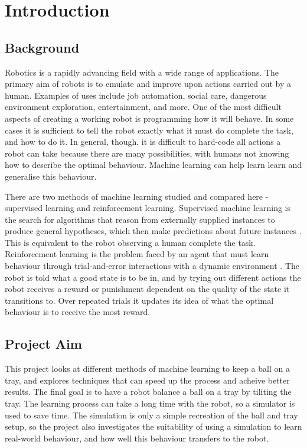 \documentclass[12pt,a4paper]{article}
\begin{document}
\section{Introduction}
\subsection{Background}
Robotics is a rapidly advancing field with a wide range of applications. The primary aim of robots is to emulate and improve upon actions carried out by a human. Examples of uses include job automation, social care, dangerous environment exploration, entertainment, and more. One of the most difficult aspects of creating a working robot is programming how it will behave. In some cases it is sufficient to tell the robot exactly what it must do complete the task, and how to do it. In general, though, it is difficult to hard-code all actions a robot can take because there are many possibilities, with humans not knowing how to describe the optimal behaviour. Machine learning can help learn learn and generalise this behaviour.

There are two methods of machine learning studied and compared here - supervised learning and reinforcement learning. Supervised machine learning is the search for algorithms that reason from externally supplied instances to produce general hypotheses, which then make predictions about future instances \cite{sl}. This is equivalent to the robot observing a human complete the task. Reinforcement learning is the problem faced by an agent that must learn behaviour through trial-and-error interactions with a dynamic environment \cite{rl_survey}. The robot is told what a good state is to be in, and by trying out different actions the robot receives a reward or punishment dependent on the quality of the state it transitions to. Over repeated trials it updates its idea of what the optimal behaviour is to receive the most reward.

\subsection{Project Aim}
This project looks at different methods of machine learning to keep a ball on a tray, and explores techniques that can speed up the process and acheive better results. The final goal is to have a robot balance a ball on a tray by tiliting the tray. The learning process can take a long time with the robot, so a simulator is used to save time. The simulation is only a simple recreation of the ball and tray setup, so the project also investigates the suitability of using a simulation to learn real-world behaviour, and how well this behaviour transfers to the robot. 
\end{document}
